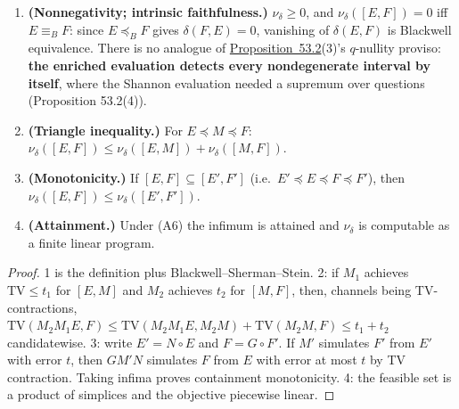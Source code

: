 \begin{thmplain}

\par\nopagebreak

\begin{enumerate}
\def\labelenumi{\arabic{enumi}.}
\tightlist
\item
  \textbf{(Nonnegativity; intrinsic faithfulness.)} \(\nu_\delta \ge 0\), and \(\nu_\delta([E,F]) = 0\) iff \(E \equiv_B F\): since \(E \preceq_B F\) gives \(\delta(F, E) = 0\), vanishing of \(\delta(E,F)\) is Blackwell equivalence. There is no analogue of \hyperlink{stmt:53.2}{Proposition~53.2}(3)'s \(q\)-nullity proviso: \textbf{the enriched evaluation detects every nondegenerate interval by itself}, where the Shannon evaluation needed a supremum over questions (Proposition 53.2(4)).
\item
  \textbf{(Triangle inequality.)} For \(E \preceq M \preceq F\): \(\nu_\delta([E,F]) \le \nu_\delta([E,M]) + \nu_\delta([M,F])\).
\item
  \textbf{(Monotonicity.)} If \([E, F] \subseteq [E', F']\) (i.e.~\(E' \preceq E \preceq F \preceq F'\)), then \(\nu_\delta([E,F]) \le \nu_\delta([E',F'])\).
\item
  \textbf{(Attainment.)} Under (A6) the infimum is attained and \(\nu_\delta\) is computable as a finite linear program.
\end{enumerate}
\end{thmplain}

\begin{proof}

1 is the definition plus Blackwell--Sherman--Stein. 2: if \(M_1\) achieves \(\mathrm{TV} \le t_1\) for \([E, M]\) and \(M_2\) achieves \(t_2\) for \([M, F]\), then, channels being TV-contractions, \(\mathrm{TV}(M_2 M_1 E, F) \le \mathrm{TV}(M_2 M_1 E, M_2 M) + \mathrm{TV}(M_2 M, F) \le t_1 + t_2\) candidatewise. 3: write \(E'=N\circ E\) and \(F=G\circ F'\). If \(M'\) simulates \(F'\) from \(E'\) with error \(t\), then \(GM'N\) simulates \(F\) from \(E\) with error at most \(t\) by TV contraction. Taking infima proves containment monotonicity. 4: the feasible set is a product of simplices and the objective piecewise linear.
\end{proof}

